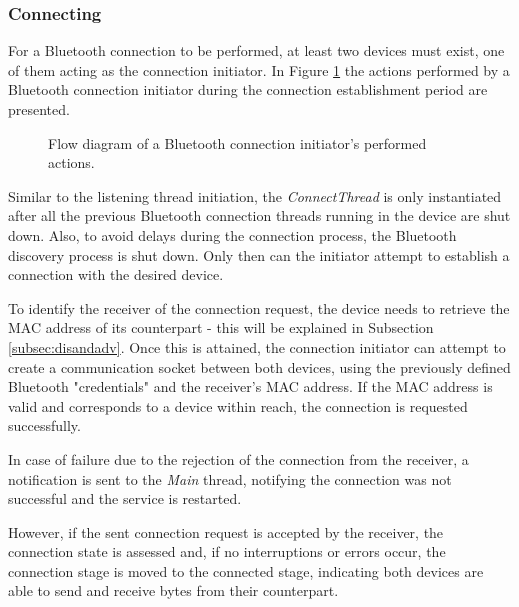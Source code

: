 \subsubsection{Connecting}
\label{subsubsec:connecting}

For a Bluetooth connection to be performed, at least two devices must exist, one of them acting as the connection initiator. In Figure \ref{fig:btrequester} the actions performed by a Bluetooth connection initiator during the connection establishment period are presented.

\begin{figure}[ht]
	\noindent{}
	\caption{\label{fig:btrequester} Flow diagram of a Bluetooth connection initiator's performed actions.}
\end{figure}

Similar to the listening thread initiation, the \textit{ConnectThread} is only instantiated after all the previous Bluetooth connection threads running in the device are shut down. Also, to avoid delays during the connection process, the Bluetooth discovery process is shut down. Only then can the initiator attempt to establish a connection with the desired device.

To identify the receiver of the connection request, the device needs to retrieve the \gls{MAC} address of its counterpart - this will be explained in Subsection \ref{subsec:disandadv}. Once this is attained, the connection initiator can attempt to create a communication socket between both devices, using the previously defined Bluetooth "credentials" and the receiver's \gls{MAC} address. If the \gls{MAC} address is valid and corresponds to a device within reach, the connection is requested successfully.

In case of failure due to the rejection of the connection from the receiver, a notification is sent to the \textit{Main} thread, notifying the connection was not successful and the service is restarted.

However, if the sent connection request is accepted by the receiver, the connection state is assessed and, if no interruptions or errors occur, the connection stage is moved to the connected stage, indicating both devices are able to send and receive bytes from their counterpart.

